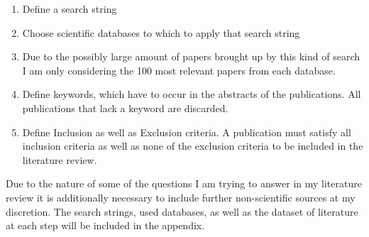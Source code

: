 \documentclass[
	11pt,								%
	DIV10,								%
	a4paper,         					%
	oneside,							%
	headheight=20pt,					%
	footheight=20pt,					%
    parskip=full,						%
    listof=totoc,						%
	bibliography=totoc,					%
	index=totoc,						%
]{scrartcl}
\begin{document}
\begin{enumerate}
	\item Define a search string
	\item Choose scientific databases to which to apply that search string
	\item Due to the possibly large amount of papers brought up by this kind of search I am only considering the 100 most relevant papers from each database.
	\item Define keywords, which have to occur in the abstracts of the publications. All publications that lack a keyword are discarded.
	\item Define Inclusion as well as Exclusion criteria. A publication must satisfy all inclusion criteria as well as none of the exclusion criteria to be included in the literature review.
\end{enumerate}
Due to the nature of some of the questions I am trying to answer in my literature review it is additionally necessary to include further non-scientific sources at my discretion.
The search strings, used databases, as well as the dataset of literature at each step will be included in the appendix. 
\end{document}
